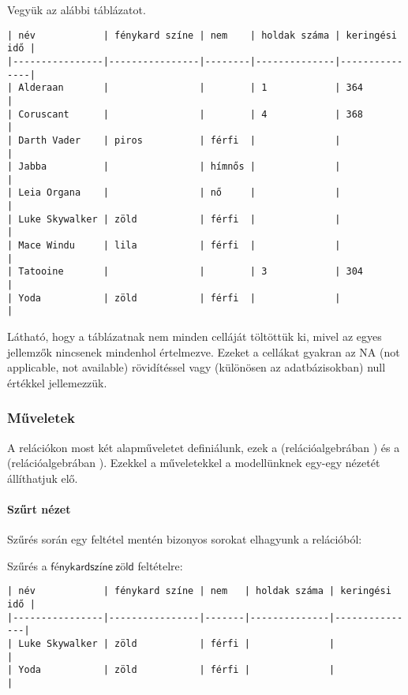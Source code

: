 \begin{pelda}
Vegyük az alábbi táblázatot.
\begin{verbatim}
| név            | fénykard színe | nem    | holdak száma | keringési idő |
|----------------|----------------|--------|--------------|---------------|
| Alderaan       |                |        | 1            | 364           |
| Coruscant      |                |        | 4            | 368           |
| Darth Vader    | piros          | férfi  |              |               |
| Jabba          |                | hímnős |              |               |
| Leia Organa    |                | nő     |              |               |
| Luke Skywalker | zöld           | férfi  |              |               |
| Mace Windu     | lila           | férfi  |              |               |
| Tatooine       |                |        | 3            | 304           |
| Yoda           | zöld           | férfi  |              |               |
\end{verbatim}
\end{pelda}
Látható, hogy a táblázatnak nem minden celláját töltöttük ki, mivel az egyes jellemzők nincsenek mindenhol értelmezve. Ezeket a cellákat gyakran az \textsf{NA} (not applicable, not available) rövidítéssel vagy (különösen az adatbázisokban) \textsf{null} értékkel jellemezzük.

\subsubsection{Műveletek}

A relációkon most két alapműveletet definiálunk, ezek a  (relációalgebrában ) és a  (relációalgebrában ). Ezekkel a műveletekkel a modellünknek egy-egy nézetét állíthatjuk elő.

\paragraph{Szűrt nézet}

Szűrés során egy feltétel mentén bizonyos sorokat elhagyunk a relációból:

Szűrés a $\mathsf{fénykard színe\: zöld}$ feltételre:

\begin{verbatim}
| név            | fénykard színe | nem   | holdak száma | keringési idő |
|----------------|----------------|-------|--------------|---------------|
| Luke Skywalker | zöld           | férfi |              |               |
| Yoda           | zöld           | férfi |              |               |
\end{verbatim}

